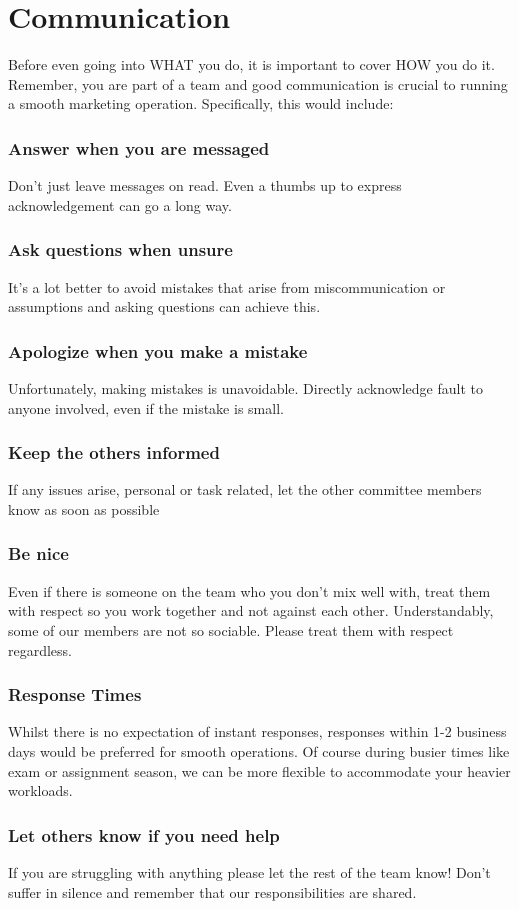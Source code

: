 \documentclass{article}
\begin{document}
\section{Communication}
Before even going into WHAT you do, it is important to cover HOW you do it. Remember, you are part of a team and good communication is crucial to running a smooth marketing operation. Specifically, this would include:
\subsubsection*{Answer when you are messaged}
Don’t just leave messages on read. Even a thumbs up to express acknowledgement can go a long way.
\subsubsection*{Ask questions when unsure}
It’s a lot better to avoid mistakes that arise from miscommunication or assumptions and asking questions can achieve this.
\subsubsection*{Apologize when you make a mistake}
Unfortunately, making mistakes is unavoidable. Directly acknowledge fault to anyone involved, even if the mistake is small.
\subsubsection*{Keep the others informed}
If any issues arise, personal or task related, let the other committee members know as soon as possible
\subsubsection*{Be nice}
Even if there is someone on the team who you don’t mix well with, treat them with respect so you work together and not against each other. Understandably, some of our members are not so sociable. Please treat them with respect regardless.
\subsubsection*{Response Times}
Whilst there is no expectation of instant responses, responses within 1-2 business days would be preferred for smooth operations. Of course during busier times like exam or assignment season, we can be more flexible to accommodate your heavier workloads.
\subsubsection*{Let others know if you need help}
If you are struggling with anything please let the rest of the team know! Don’t suffer in silence and remember that our responsibilities are shared.
\end{document}
